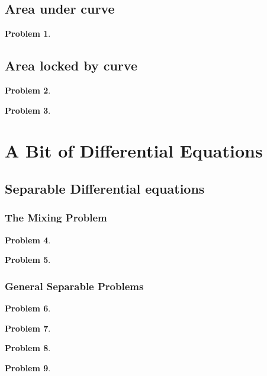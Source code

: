 \documentclass{article}
\newtheorem{problem}{Problem}
\begin{document}
\subsection{Area under curve}
\begin{problem}

\end{problem}
\subsection{Area locked by  curve}
\begin{problem}

\end{problem}


\begin{problem}

\end{problem}
\section{A Bit of Differential Equations}
\subsection{Separable Differential equations}
\subsubsection{The Mixing Problem}
\begin{problem}

\end{problem}


\begin{problem}

\end{problem}

\subsubsection{General Separable Problems}
\begin{problem}

\end{problem}


\begin{problem}

\end{problem}
\begin{problem}

\end{problem}
\begin{problem}

\end{problem}

\end{document}
